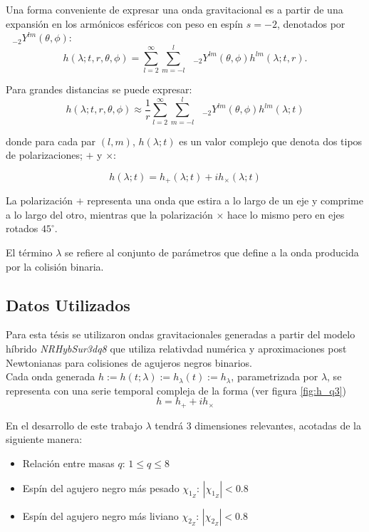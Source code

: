 Una forma conveniente de expresar una onda gravitacional es a partir de una expansión en los armónicos esféricos con peso en espín $s=-2$, denotados por $\text{ }_{-2} Y^{lm} (\theta, \phi)$:
\begin{equation}
h( \lambda; t, r, \theta , \phi) =  \sum_{l=2}^{\infty}  \sum_{m=-l}^{l} \text{ }_{-2} Y^{lm} (\theta, \phi) h^{lm}(\lambda; t, r).
\end{equation}


Para grandes distancias se puede expresar:
\begin{equation}
h( \lambda; t, r, \theta , \phi) \approx \frac{1}{r}  \sum_{l=2}^{\infty}  \sum_{m=-l}^{l} \text{ }_{-2} Y^{lm} (\theta, \phi) h^{lm}(\lambda; t)
\end{equation}

donde para cada par $(l, m)$, $h(\lambda; t)$ es un valor complejo que denota dos tipos de polarizaciones; $+$ y $\times$:

\begin{equation}
h(\lambda; t) = h_{+}(\lambda; t) + i h_{\times}(\lambda; t)
\end{equation}

La polarización $+$ representa una onda que estira a lo largo de un eje y comprime a lo largo del otro, mientras que la polarización $\times$ hace lo mismo pero en ejes rotados $45^{\circ}$.

El término $\lambda$ se refiere al conjunto de parámetros que define a la onda producida por la colisión binaria.


\subsection*{Datos Utilizados}

Para esta tésis se utilizaron ondas gravitacionales generadas a partir del modelo híbrido \textit{NRHybSur3dq8}\cite{Varma_2019} que utiliza relativdad numérica y aproximaciones post Newtonianas para colisiones de agujeros negros binarios.
\\

Cada onda generada \( h := h(t; \lambda) := h_{\lambda}(t) := h_{\lambda} \), parametrizada por $\lambda$, se representa con una serie temporal compleja de la forma (ver figura \ref{fig:h_q3})
\[
h = h_+ + ih_{\times}
\]

En el desarrollo de este trabajo \(\lambda\) tendrá 3 dimensiones relevantes, acotadas de la siguiente manera:

\begin{itemize}
\item Relación entre masas $q$: $1 \le q \le 8$
\item Espín del agujero negro más pesado $\chi_{1_Z}$: $|\chi_{1_Z}| < 0.8$
\item Espín del agujero negro más liviano $\chi_{2_Z}$: $|\chi_{2_Z}| < 0.8$
\end{itemize}

